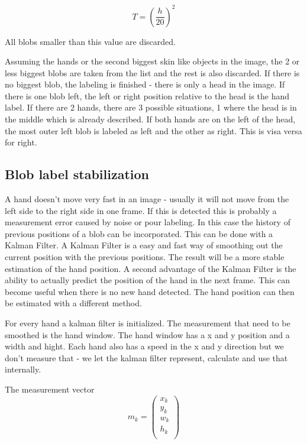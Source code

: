 \begin{equation}
T = (\frac{h}{20})^2
\end{equation}

All blobs smaller than this value are discarded. 

Assuming the hands or the second biggest skin like objects in the image, the 2 or less biggest blobs are taken from the list and the rest is also discarded. If there is no biggest blob, the labeling is finished - there is only a head in the image. If there is one blob left, the left or right position relative to the head is the hand label. If there are 2 hands, there are 3 possible situations, 1 where the head is in the middle which is already described. If both hands are on the left of the head, the most outer left blob is labeled as left and the other as right. This is visa versa for right.


\subsection*{Blob label stabilization}
A hand doesn't move very fast in an image - usually it will not move from the left side to the right side in one frame. If this is detected this is probably a measurement error caused by noise or pour labeling. In this case the history of previous positions of a blob can be incorporated. This can be done with a Kalman Filter. A Kalman Filter is a easy and fast way of smoothing out the current position with the previous positions. The result will be a more stable estimation of the hand position. A second advantage of the Kalman Filter is the ability to actually predict the position of the hand in the next frame. This can become useful when there is no new hand detected. The hand position can then be estimated with a different method.

For every hand a kalman filter is initialized. The measurement that need to be smoothed is the hand window. The hand window has a x and y position and a width and hight. Each hand also has a speed in the x and y direction but we don't measure that - we let the kalman filter represent, calculate and use that internally. 

The measurement vector \[ m_k = \left(
\begin{array}{c}
	x_k \\ %
	y_k \\ %
	w_k \\ %
	h_k \\ %
\end{array} \right)\]


